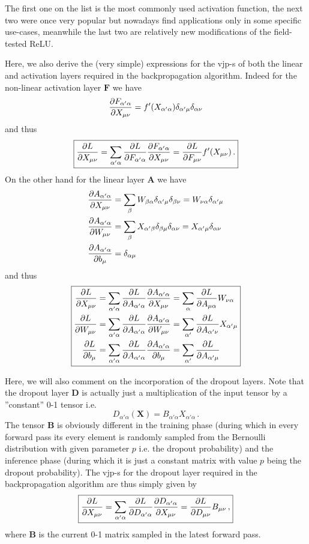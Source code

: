 \documentclass{myclass}
\begin{document}
The first one on the list is the most commonly used activation function, the next two were once very
popular but nowadays find applications only in some specific use-cases, meanwhile the last two are
relatively new modifications of the field-tested ReLU.

Here, we also derive the (very simple) expressions for the vjp-s of both the linear and activation
layers required in the backpropagation algorithm. Indeed for the non-linear activation layer
$\bm{F}$ we have
\[
   \pdv{F_{\alpha'\alpha}}{X_{\mu\nu}} = f'(X_{\alpha'\alpha}) \delta_{\alpha'\mu} \delta_{\alpha\nu}
\]
and thus
\[
\boxed
{
   \pdv{L}{X_{\mu\nu}} = \sum_{\alpha'\alpha} \pdv{L}{F_{\alpha'\alpha}} \pdv{F_{\alpha'\alpha}}{X_{\mu\nu}} = \pdv{L}{F_{\mu\nu}} f'(X_{\mu\nu})\,.
}
\]
On the other hand for the linear layer $\bm{A}$ we have
\[
\begin{split}
   \pdv{A_{\alpha'\alpha}}{X_{\mu\nu}} &= \sum_{\beta} W_{\beta\alpha} \delta_{\alpha'\mu} \delta_{\beta\nu} = W_{\nu\alpha} \delta_{\alpha'\mu}\\
   \pdv{A_{\alpha'\alpha}}{W_{\mu\nu}} &= \sum_{\beta} X_{\alpha'\beta} \delta_{\beta\mu} \delta_{\alpha\nu} = X_{\alpha'\mu} \delta_{\alpha\nu}\\
   \pdv{A_{\alpha'\alpha}}{b_{\mu}   } &= \delta_{\alpha\mu}
\end{split}
\]
and thus
\[
\boxed
{
\begin{split}
   \pdv{L}{X_{\mu\nu}} &= \sum_{\alpha'\alpha} \pdv{L}{A_{\alpha'\alpha}} \pdv{A_{\alpha'\alpha}}{X_{\mu\nu}} = \sum_{\alpha} \pdv{L}{A_{\mu\alpha}} W_{\nu\alpha} \\
   \pdv{L}{W_{\mu\nu}} &= \sum_{\alpha'\alpha} \pdv{L}{A_{\alpha'\alpha}} \pdv{A_{\alpha'\alpha}}{W_{\mu\nu}} = \sum_{\alpha'} \pdv{L}{A_{\alpha'\nu}} X_{\alpha'\mu} \\
   \pdv{L}{b_\mu     } &= \sum_{\alpha'\alpha} \pdv{L}{A_{\alpha'\alpha}} \pdv{A_{\alpha'\alpha}}{b_\mu     } = \sum_{\alpha'} \pdv{L}{A_{\alpha'\mu}}
\end{split}
}
\]

Here, we will also comment on the incorporation of the dropout layers. Note that the dropout layer
$\bm{D}$ is actually just a multiplication of the input tensor by a ''constant'' 0-1 tensor i.e.
\[
   D_{\alpha'\alpha}(\bm{X}) = B_{\alpha'\alpha} X_{\alpha'\alpha}\,.
\]
The tensor $\bm{B}$ is obviously different in the training phase (during which in every forward pass
its every element is randomly sampled from the Bernoulli distribution with given parameter $p$ i.e.
the dropout probability) and the inference phase (during which it is just a constant matrix with
value $p$ being the dropout probability). The vjp-s for the dropout layer required in the
backpropagation algorithm are thus simply given by
\[
\boxed
{
   \pdv{L}{X_{\mu\nu}} = \sum_{\alpha'\alpha} \pdv{L}{D_{\alpha'\alpha}} \pdv{D_{\alpha'\alpha}}{X_{\mu\nu}} = \pdv{L}{D_{\mu\nu}} B_{\mu\nu}\,,
}
\]
where $\bm{B}$ is the current 0-1 matrix sampled in the latest forward pass.
\end{document}
